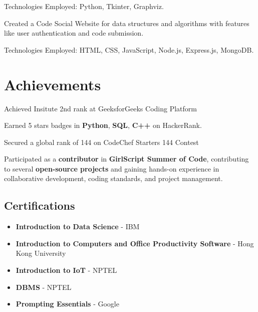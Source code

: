 \documentclass[]{deedy-resume-openfont}
\begin{document}
\begin{minipage}[t]{0.66\textwidth}
\begin{normalsize}
\begin{tightemize}
    \item Technologies Employed: Python, Tkinter, Graphviz.
\end{tightemize}
\end{normalsize}
\sectionsep

\begin{normalsize} %
\begin{tightemize}
    \item Created a Code Social Website for data structures and algorithms with features like user authentication and code submission.
    
    \item Technologies Employed: HTML, CSS, JavaScript, Node.js, Express.js, MongoDB.
\end{tightemize}
\end{normalsize}
\sectionsep





\section{Achievements } 
 \begin{tightemize}
    \item Achieved  Insitute 2nd rank at GeeksforGeeks Coding Platform
    \item Earned 5 stars  badges in \textbf{Python}, \textbf{SQL}, \textbf{C++}
  on HackerRank.
    \item Secured a global rank of 144 on CodeChef  Starters 144 Contest
  \item Participated as a \textbf{contributor} in \textbf{GirlScript Summer of Code}, contributing to several \textbf{open-source projects} and gaining hands-on experience in collaborative development, coding standards, and project management. 
 \vspace{0.5cm}  %

   \subsection*{Certifications}
\begin{itemize}
    \item \textbf{Introduction to Data Science} - IBM
    \item \textbf{Introduction to Computers and Office Productivity Software} - Hong Kong University
    \item \textbf{Introduction to IoT} - NPTEL
    \item \textbf{DBMS} - NPTEL
    \item \textbf{Prompting Essentials} - Google
\end{itemize}

    
\end{tightemize} 





\end{minipage} 
\end{document}
